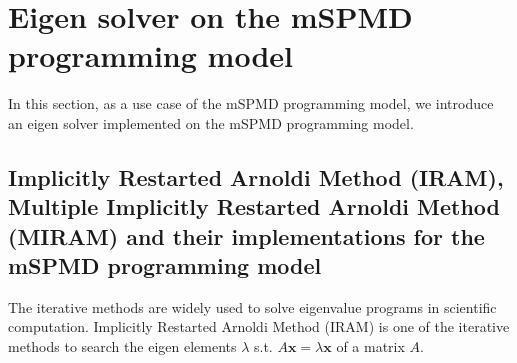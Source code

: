 \documentclass[graybox]{svmult}
\begin{document}
\section{Eigen solver on the mSPMD programming model}

In this section, as a use case of the mSPMD programming model, 
we introduce an eigen solver implemented on the mSPMD programming model. 

\subsection{Implicitly Restarted Arnoldi Method (IRAM), Multiple Implicitly Restarted Arnoldi Method (MIRAM) and their implementations for the mSPMD programming model} 

The iterative methods are widely used to solve eigenvalue programs in scientific computation. 
Implicitly Restarted Arnoldi Method (IRAM) \cite{Sorensen-iram} is one of the iterative methods to search the eigen elements $\lambda$ s.t. $A \bm{x} = \lambda \bm{x} $ of a matrix $A$. 
\end{document}
